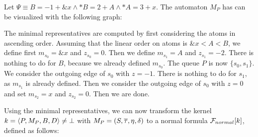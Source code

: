 \begin{example}\label{ex:min-repr}
    Let $\Psi \equiv B = -1 + \&x \land *B = 2 + A \land *A = 3 + x$.
    The automaton $M_P$ has can be visualized with the following graph:
    \begin{center}
    \end{center}
    The minimal representatives are computed by first considering the atoms in ascending order.
    Assuming that the linear order on atoms is $\&x < A < B$,
    we define first $m_{s_0} = \&x$ and $z_{s_0} = 0$.
    Then we define $m_{s_1} = A$ and $z_{s_1} = -2$.
    There is nothing to do for $B$, because we already defined $m_{s_0}$.
    The queue $P$ is now $\{s_0, s_1\}$.
    We consider the outgoing edge of $s_0$ with $z = -1$.
    There is nothing to do for $s_1$, as $m_{s_1}$ is already defined.
    Then we consider the outgoing edge of $s_0$ with $z = 0$
    and set $m_{s_2} = x$ and $z_{s_2} = 0$.
    Then we are done.
\end{example}
Using the minimal representatives, we can now transform the kernel $k = \langle P,M_P,B,D\rangle \neq \bot$ with $M_P = (S, \overline{\tau}, \eta, \delta)$ to a normal formula $\mathcal{F}_{normal}[k]$,
defined as follows:

